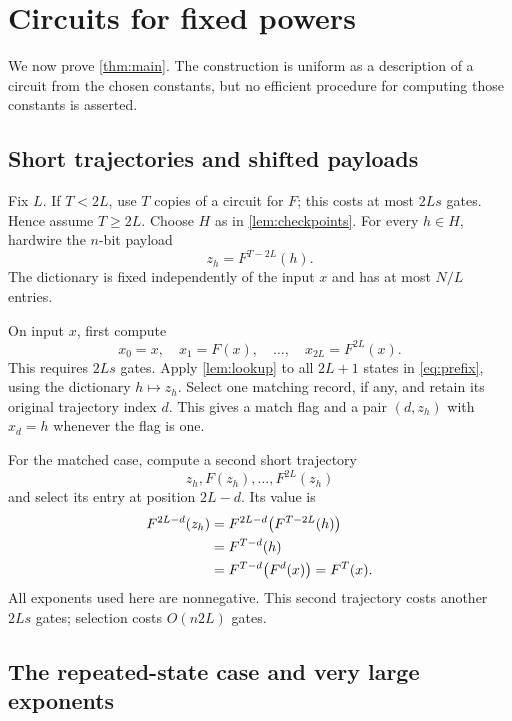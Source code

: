 \documentclass[11pt]{article}
\theoremstyle{definition}
\theoremstyle{remark}
\numberwithin{equation}{section}
\begin{document}
\section{Circuits for fixed powers}\label{sec:fixed}

We now prove \cref{thm:main}.  The construction is uniform as a description
of a circuit from the chosen constants, but no efficient procedure for
computing those constants is asserted.

\subsection{Short trajectories and shifted payloads}

Fix $L$.  If $T<2L$, use $T$ copies of a circuit for $F$;
this costs at most $2Ls$ gates.  Hence assume $T\geq 2L$.
Choose $H$ as in \cref{lem:checkpoints}.  For every $h\in H$, hardwire the
$n$-bit payload
\begin{equation}\label{eq:payload}
  z_h=F^{T-2L}(h).
\end{equation}
The dictionary is fixed independently of the input $x$ and has at most
$N/L$ entries.

On input $x$, first compute
\begin{equation}\label{eq:prefix}
  x_0=x,\quad x_1=F(x),\quad\ldots,\quad x_{2L}=F^{2L}(x).
\end{equation}
This requires $2Ls$ gates.  Apply \cref{lem:lookup} to all $2L+1$ states in
\cref{eq:prefix}, using the dictionary $h\mapsto z_h$.  Select one
matching record, if any, and retain its original trajectory index $d$.
This gives a match flag and a pair $(d,z_h)$ with $x_d=h$ whenever the
flag is one.

For the matched case, compute a second short trajectory
\[
  z_h,F(z_h),\ldots,F^{2L}(z_h)
\]
and select its entry at position $2L-d$.  Its value is
\begin{align}
  F^{2L-d}(z_h)
    &=F^{2L-d}\bigl(F^{T-2L}(h)\bigr)\notag\\
    &=F^{T-d}(h)\notag\\
    &=F^{T-d}\bigl(F^d(x)\bigr)
     =F^T(x).\label{eq:identity}
\end{align}
All exponents used here are nonnegative.  This second trajectory costs
another $2Ls$ gates; selection costs $O(n2L)$ gates.

\subsection{The repeated-state case and very large exponents}
\end{document}
